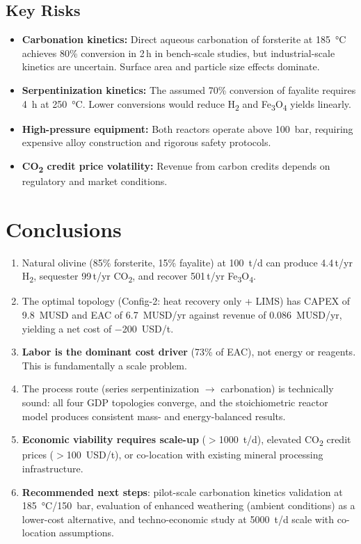 \documentclass[11pt,a4paper]{article}
\begin{document}
\subsection{Key Risks}

\begin{itemize}[noitemsep]
  \item \textbf{Carbonation kinetics:} Direct aqueous carbonation of forsterite at \SI{185}{\celsius} achieves 80\% conversion in 2\,h in bench-scale studies, but industrial-scale kinetics are uncertain. Surface area and particle size effects dominate.
  \item \textbf{Serpentinization kinetics:} The assumed 70\% conversion of fayalite requires \SI{4}{h} at \SI{250}{\celsius}. Lower conversions would reduce H\textsubscript{2} and Fe\textsubscript{3}O\textsubscript{4} yields linearly.
  \item \textbf{High-pressure equipment:} Both reactors operate above \SI{100}{bar}, requiring expensive alloy construction and rigorous safety protocols.
  \item \textbf{CO\textsubscript{2} credit price volatility:} Revenue from carbon credits depends on regulatory and market conditions.
\end{itemize}

\section{Conclusions}

\begin{enumerate}
  \item Natural olivine (85\% forsterite, 15\% fayalite) at \SI{100}{t/d} can produce 4.4\,t/yr H\textsubscript{2}, sequester 99\,t/yr CO\textsubscript{2}, and recover 501\,t/yr Fe\textsubscript{3}O\textsubscript{4}.
  \item The optimal topology (Config-2: heat recovery only + LIMS) has CAPEX of \SI{9.8}{MUSD} and EAC of \SI{6.7}{MUSD/yr} against revenue of \SI{0.086}{MUSD/yr}, yielding a net cost of \SI{-200}{USD/t}.
  \item \textbf{Labor is the dominant cost driver} (73\% of EAC), not energy or reagents. This is fundamentally a scale problem.
  \item The process route (series serpentinization $\rightarrow$ carbonation) is technically sound: all four GDP topologies converge, and the stoichiometric reactor model produces consistent mass- and energy-balanced results.
  \item \textbf{Economic viability requires scale-up} ($>$\SI{1000}{t/d}), elevated CO\textsubscript{2} credit prices ($>$\SI{100}{USD/t}), or co-location with existing mineral processing infrastructure.
  \item \textbf{Recommended next steps}: pilot-scale carbonation kinetics validation at \SI{185}{\celsius}/\SI{150}{bar}, evaluation of enhanced weathering (ambient conditions) as a lower-cost alternative, and techno-economic study at \SI{5000}{t/d} scale with co-location assumptions.
\end{enumerate}
\end{document}

